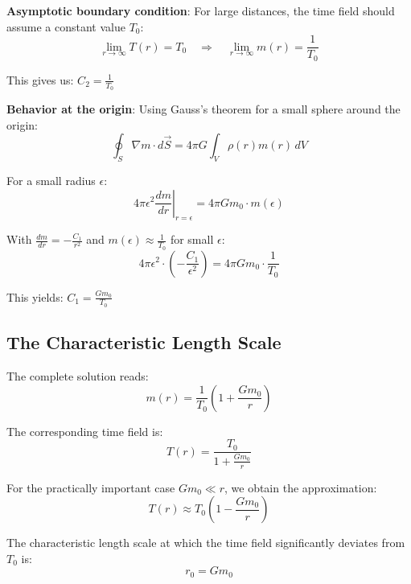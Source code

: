 	\textbf{Asymptotic boundary condition}: For large distances, the time field should assume a constant value $T_0$:
	\begin{equation}
		\lim_{r \to \infty} T(r) = T_0 \quad \Rightarrow \quad \lim_{r \to \infty} m(r) = \frac{1}{T_0}
	\end{equation}
	
	This gives us: $C_2 = \frac{1}{T_0}$
	
	\textbf{Behavior at the origin}: Using Gauss's theorem \citep{griffiths1999,jackson1998} for a small sphere around the origin:
	\begin{equation}
		\oint_S \nabla m \cdot d\vec{S} = 4\pi G \int_V \rho(r) m(r) \, dV
	\end{equation}
	
	For a small radius $\epsilon$:
	\begin{equation}
		4\pi \epsilon^2 \left.\frac{dm}{dr}\right|_{r=\epsilon} = 4\pi G m_0 \cdot m(\epsilon)
	\end{equation}
	
	With $\frac{dm}{dr} = -\frac{C_1}{r^2}$ and $m(\epsilon) \approx \frac{1}{T_0}$ for small $\epsilon$:
	\begin{equation}
		4\pi \epsilon^2 \cdot \left(-\frac{C_1}{\epsilon^2}\right) = 4\pi G m_0 \cdot \frac{1}{T_0}
	\end{equation}
	
	This yields: $C_1 = \frac{G m_0}{T_0}$
	
	\subsection{The Characteristic Length Scale}
	\label{subsec:characteristic_length}
	
	The complete solution reads:
	\begin{equation}
		m(r) = \frac{1}{T_0}\left(1 + \frac{G m_0}{r}\right)
	\end{equation}
	
	The corresponding time field is:
	\begin{equation}
		T(r) = \frac{T_0}{1 + \frac{G m_0}{r}}
	\end{equation}
	
	For the practically important case $G m_0 \ll r$, we obtain the approximation:
	\begin{equation}
		T(r) \approx T_0\left(1 - \frac{G m_0}{r}\right)
	\end{equation}
	
	The characteristic length scale at which the time field significantly deviates from $T_0$ is:
	\begin{equation}
		\boxed{r_0 = G m_0}
	\end{equation}
	
